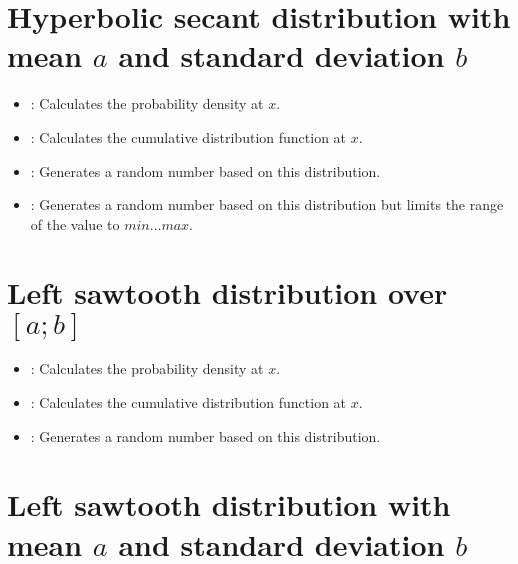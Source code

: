\section{Hyperbolic secant distribution with mean \texorpdfstring{$a$}{a} and standard deviation \texorpdfstring{$b$}{b}}

\begin{itemize}

\item
{}:
Calculates the probability density at $x$.

\item
{}:
Calculates the cumulative distribution function at $x$.

\item
{}:
Generates a random number based on this distribution.

\item
{}:
Generates a random number based on this distribution but limits the range of the value to $min\ldots max$.

\end{itemize}



\section{Left sawtooth distribution over \texorpdfstring{$[a;b]$}{[a;b]}}

\begin{itemize}

\item
{}:
Calculates the probability density at $x$.

\item
{}:
Calculates the cumulative distribution function at $x$.

\item
{}:
Generates a random number based on this distribution.

\end{itemize}



\section{Left sawtooth distribution with mean \texorpdfstring{$a$}{a} and standard deviation \texorpdfstring{$b$}{b}}

